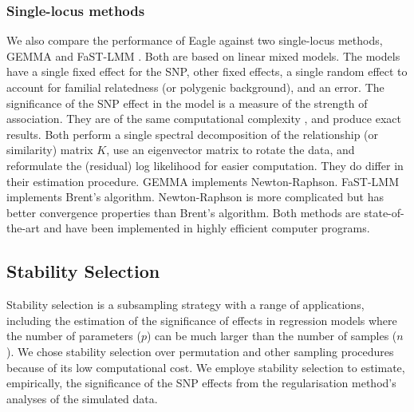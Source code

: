 \documentclass{nature}
\begin{document}
\subsubsection*{Single-locus methods}

We also compare the performance of Eagle against two single-locus methods, GEMMA \cite{zhou2012genome} and FaST-LMM \cite{lippert2011fast}. Both are based on linear mixed models. The models have a single fixed effect for the SNP,  other fixed effects, 
a single random effect to account for familial relatedness (or polygenic background), and an error. The significance of the SNP effect in the model 
is a measure of the strength of association.  They are of the same computational complexity \cite{zhou2012genome}, and produce exact results.  
Both perform a single spectral decomposition of the relationship (or similarity) matrix $K$, use  an eigenvector matrix to rotate the data, 
and reformulate the (residual) log likelihood for easier computation. They do differ in their estimation procedure. GEMMA implements Newton-Raphson. 
FaST-LMM implements Brent's algorithm. Newton-Raphson is more complicated but has better convergence properties than Brent's algorithm. 
Both methods are state-of-the-art and have been implemented in highly efficient computer programs. 



\subsection{Stability Selection}
Stability selection \cite{meinshausen2010stability}  is a subsampling strategy with a range of applications, including the estimation of the significance of effects in regression models where 
the number of parameters ($p$) can be much larger than the number of samples ($n$). We chose stability selection over permutation and other sampling procedures because of its low computational cost. We employe stability selection to estimate, empirically, the significance of the SNP effects from the regularisation method's analyses of the simulated data.
\end{document}
